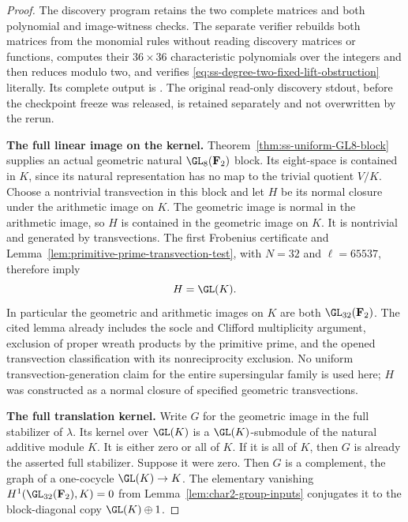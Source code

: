 \begin{proof}
The discovery program
retains the two complete matrices and both polynomial and image-witness
checks. The separate verifier
rebuilds both matrices from the monomial rules without reading discovery
matrices or functions, computes their $36\times36$ characteristic
polynomials over the integers and then reduces modulo two, and verifies
\eqref{eq:ss-degree-two-fixed-lift-obstruction} literally. Its complete
output is
.
The original read-only discovery stdout, before the checkpoint freeze
was released, is retained separately and not overwritten by the rerun.

\par\smallskip\noindent\textbf{The full linear image on the kernel.}
Theorem~\ref{thm:ss-uniform-GL8-block} supplies an actual geometric natural
$\GL_8(\mathbf F_2)$ block. Its eight-space is contained in $K$, since
its natural representation has no map to the trivial quotient $V/K$.
Choose a nontrivial transvection in this block and let $H$ be its normal
closure under the arithmetic image on $K$.
The geometric image is normal in the arithmetic image, so $H$ is
contained in the geometric image on $K$. It is nontrivial and generated
by transvections. The first Frobenius certificate and
Lemma~\ref{lem:primitive-prime-transvection-test}, with $N=32$ and
$\ell=65537$, therefore imply
\[
                       H=\GL(K).
\]
In particular the geometric and arithmetic images on $K$ are both
$\GL_{32}(\mathbf F_2)$. The cited lemma already includes the socle and
Clifford multiplicity argument, exclusion of proper wreath products by
the primitive prime, and the opened transvection classification with
its nonreciprocity exclusion. No uniform transvection-generation claim
for the entire supersingular family is used here; $H$ was constructed
as a normal closure of specified geometric transvections.

\par\smallskip\noindent\textbf{The full translation kernel.}
Write $G$ for the geometric image in the full stabilizer of $\lambda$.
Its kernel over $\GL(K)$ is a $\GL(K)$-submodule of the natural additive
module $K$. It is either zero or all of $K$.
If it is all of $K$, then $G$ is already the asserted full stabilizer.
Suppose it were zero. Then $G$ is a complement, the graph of a
one-cocycle $\GL(K)\to K$. The elementary vanishing
$H^1(\GL_{32}(\mathbf F_2),K)=0$ from
Lemma~\ref{lem:char2-group-inputs} conjugates it to the block-diagonal
copy $\GL(K)\oplus1$.


\end{proof}
